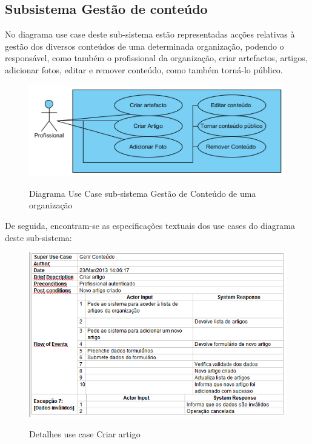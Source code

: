 \documentclass[12pt,a4paper]{article}
\begin{document}
\clearpage


\subsection{Subsistema Gestão de conteúdo}
No diagrama use case deste sub-sistema estão representadas acções relativas à gestão dos diversos conteúdos de uma determinada organização, podendo o responsável, como também o profissional da organização, criar artefactos, artigos, adicionar fotos, editar e remover conteúdo, como também torná-lo público.\\

\begin{figure}[h!]
\centering
\includegraphics[scale=1]{usecase/P_GerirConteudo}
\label{usecase}
\caption{Diagrama Use Case sub-sistema Gestão de Conteúdo de uma organização}
\end{figure}

De seguida, encontram-se as especificações textuais dos use cases do diagrama deste sub-sistema:\\

\begin{figure}[h!]
\centering
\includegraphics[scale=0.7]{d_usecase/criarartigo}
\label{usecase}
\caption{Detalhes use case Criar artigo}
\end{figure}
\end{document}
